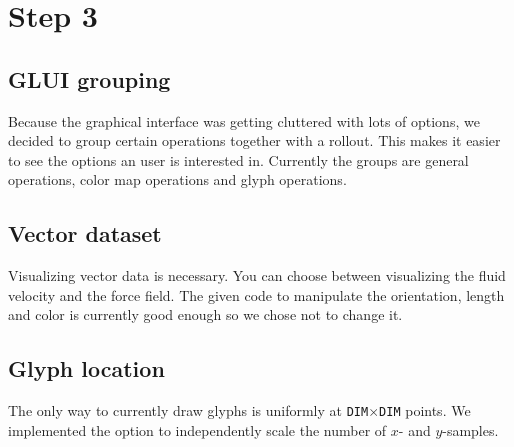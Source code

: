 \section*{Step 3}
 \subsection*{GLUI grouping}
 Because the graphical interface was getting cluttered with lots of options, we decided to group certain operations together with a rollout. This makes it easier to see the options an user is interested in. Currently the groups are general operations, color map operations and glyph operations.
 \subsection*{Vector dataset}
 Visualizing vector data is necessary. You can choose between visualizing the fluid velocity and the force field. The given code to manipulate the orientation, length and color is currently good enough so we chose not to change it. 
 \subsection*{Glyph location}
 The only way to currently draw glyphs is uniformly at \texttt{DIM}$\times$\texttt{DIM} points. We implemented the option to independently scale the number of $x$- and $y$-samples. 

